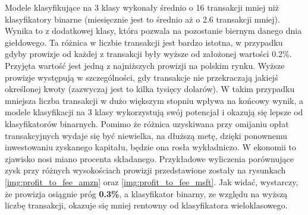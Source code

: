 \documentclass[a4paper, twoside, 11pt, openright]{article}
\begin{document}
 Modele klasyfikujące na 3 klasy wykonały średnio o 16 transakcji mniej niż klasyfikatory binarne (miesięcznie jest to średnio aż o 2.6 transakcji mniej). Wynika to z dodatkowej klasy, która pozwala na pozostanie biernym danego dnia giełdowego. Ta różnica w liczbie transakcji jest bardzo istotna, w przypadku gdyby prowizje od każdej z transakcji były wyższe od założonej wartości 0.2\%. Przyjęta wartość jest jedną z najniższych prowizji na polskim rynku. Wyższe prowizje występują w szczególności, gdy transakcje nie przekraczają jakiejś określonej kwoty (zazwyczaj jest to kilka tysięcy dolarów). W takim przypadku mniejsza liczba transakcji w dużo większym stopniu wpływa na końcowy wynik, a modele klasyfikacji na 3 klasy wykorzystują swój potencjał i okazują się lepsze od klasyfikatorów binarnych. Pomimo że różnica uzyskiwana przy omijaniu opłat transakcyjnych wydaje się być niewielka, na dłuższą metę, dzięki ponownemu inwestowaniu zyskanego kapitału, będzie ona rosła wykładniczo. W ekonomii to zjawisko nosi miano procenta składanego. Przykładowe wyliczenia porównujące zysk przy różnych wysokościach prowizji przedstawione zostały na rysunkach \ref{img:profit_to_fee_amzn} oraz \ref{img:profit_to_fee_msft}. Jak widać, wystarczy, że prowizja osiągnie próg \textbf{0.3\%}, a klasyfikator binarny, ze względu na wyższą liczbę transakcji, okazuje się mniej rentowny od klasyfikatora wieloklasowego.
 
\end{document}
